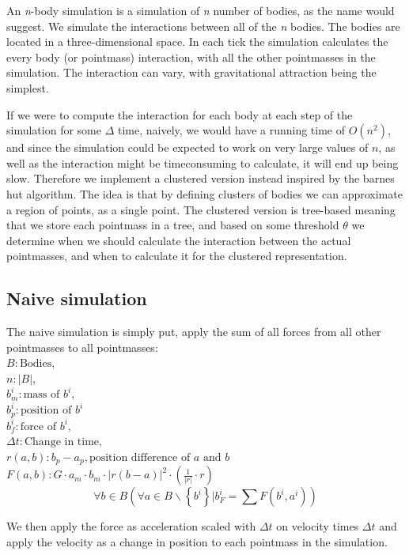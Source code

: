 An \textit{n}-body simulation is a simulation of \textit{n} number of bodies, as
the name would suggest. We simulate the interactions between all of the
\textit{n} bodies. The bodies are located in a three-dimensional space. In each
tick the simulation calculates the every body (or pointmass) interaction, with
all the other pointmasses in the simulation. The interaction can vary, with
gravitational attraction being the simplest.

If we were to compute the interaction for each body at each step of the
simulation for some $\Delta$ time, naively, we would have a running time of
$O(n^2)$, and since the simulation could be expected to work on very large
values of $n$, as well as the interaction might be timeconsuming to calculate,
it will end up being slow. Therefore we implement a clustered version instead
inspired by the barnes hut algorithm. The idea is that by defining clusters of
bodies we can approximate a region of points, as a single point. The clustered
version is tree-based meaning that we store each pointmass in a tree, and based
on some threshold $\theta$ we determine when we should calculate the interaction
between the actual pointmasses, and when to calculate it for the clustered
representation.

\subsection{Naive simulation}
The naive simulation is simply put, apply the sum of all forces from all
other pointmasses to all pointmasses:         \\
$B: \text{Bodies},$                           \\
$n: |B|,$                                     \\
$b^i_m: \text{mass of } b^i,$                 \\
$b^i_p: \text{position of } b^i $\\
$b^i_f: \text{force of } b^i,$                \\
$\Delta t: \text{Change in time},$                \\
$r(a, b): b_p - a_p, \text{position difference of $a$ and $b$}$\\
$F(a, b): G \cdot a_m \cdot b_m \cdot |r(b - a)|^2 \cdot \left(\frac{1}{|r|} \cdot r\right)$
$$\forall b \in B (\forall a \in B \backslash \left\{ b^i\right\} | b^i_F = \sum F(b^i, a^i))$$

We then apply the force as acceleration scaled with $\Delta t$ on velocity
times $\Delta t$ and apply the velocity as a change in position to each
pointmass in the simulation.

